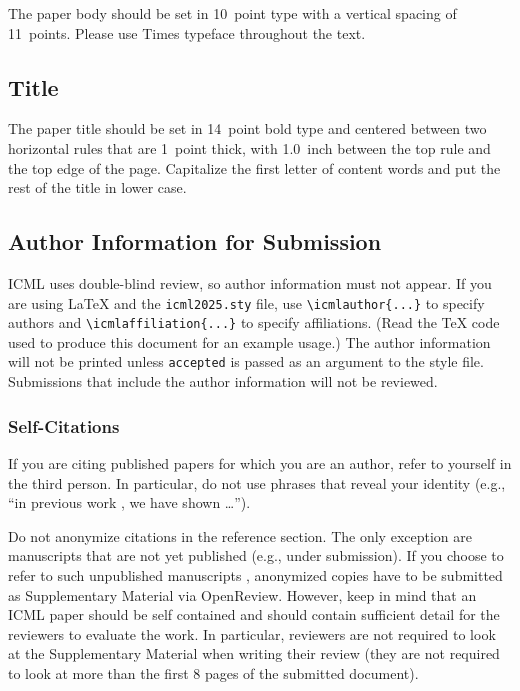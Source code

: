 \documentclass{article}
\theoremstyle{plain}
\theoremstyle{definition}
\theoremstyle{remark}
\begin{document}
The paper body should be set in 10~point type with a vertical spacing
of 11~points. Please use Times typeface throughout the text.

\subsection{Title}

The paper title should be set in 14~point bold type and centered
between two horizontal rules that are 1~point thick, with 1.0~inch
between the top rule and the top edge of the page. Capitalize the
first letter of content words and put the rest of the title in lower
case.

\subsection{Author Information for Submission}
\label{author info}

ICML uses double-blind review, so author information must not appear. If
you are using \LaTeX\/ and the \texttt{icml2025.sty} file, use
\verb+\icmlauthor{...}+ to specify authors and \verb+\icmlaffiliation{...}+ to specify affiliations. (Read the TeX code used to produce this document for an example usage.) The author information
will not be printed unless \texttt{accepted} is passed as an argument to the
style file.
Submissions that include the author information will not
be reviewed.

\subsubsection{Self-Citations}

If you are citing published papers for which you are an author, refer
to yourself in the third person. In particular, do not use phrases
that reveal your identity (e.g., ``in previous work \cite{langley00}, we
have shown \ldots'').

Do not anonymize citations in the reference section. The only exception are manuscripts that are
not yet published (e.g., under submission). If you choose to refer to
such unpublished manuscripts \cite{anonymous}, anonymized copies have
to be submitted
as Supplementary Material via OpenReview\@. However, keep in mind that an ICML
paper should be self contained and should contain sufficient detail
for the reviewers to evaluate the work. In particular, reviewers are
not required to look at the Supplementary Material when writing their
review (they are not required to look at more than the first $8$ pages of the submitted document).
\end{document}
